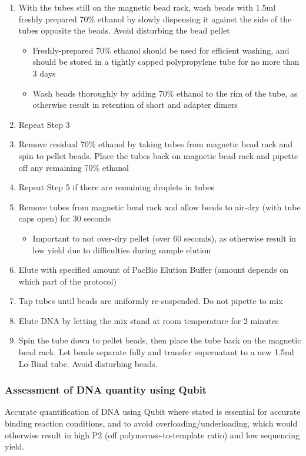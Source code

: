 \begin{enumerate}
\begin{itemize}
	\end{itemize}
	\item With the tubes still on the magnetic bead rack, wash beads with 1.5ml freshly prepared 70\% ethanol by slowly dispensing it against the side of the tubes opposite the beads. Avoid disturbing the bead pellet
	\begin{itemize}
		\item Freshly-prepared 70\% ethanol should be used for efficient washing, and should be stored in a tightly capped polypropylene tube for no more than 3 days
		\item Wash beads thoroughly by adding 70\% ethanol to the rim of the tube, as otherwise result in retention of short and adapter dimers
	\end{itemize} 	
	\item Repeat Step 3 
	\item Remove residual 70\% ethanol by taking tubes from magnetic bead rack and spin to pellet beads. Place the tubes back on magnetic bead rack and pipette off any remaining 70\% ethanol
	\item Repeat Step 5 if there are remaining droplets in tubes 
	\item Remove tubes from magnetic bead rack and allow beads to air-dry (with tube caps open) for 30 seconds
	\begin{itemize}
		\item Important to not over-dry pellet (over 60 seconds), as otherwise result in low yield due to difficulties during sample elution 
	\end{itemize}
	\item Elute with specified amount of PacBio Elution Buffer (amount depends on which part of the protocol)
	\item Tap tubes until beads are uniformly re-suspended. Do not pipette to mix
	\item Elute DNA by letting the mix stand at room temperature for 2 minutes
	\item Spin the tube down to pellet beads, then place the tube back on the magnetic bead rack. Let beads separate fully and transfer supernatant to a new 1.5ml Lo-Bind tube. Avoid disturbing beads. 
\end{enumerate}


\subsubsection{Assessment of DNA quantity using Qubit}
Accurate quantification of DNA using Qubit where stated is essential for accurate binding reaction conditions, and to avoid overloading/underloading, which would otherwise result in high P2 (off polymerase-to-template ratio) and low sequencing yield. 

